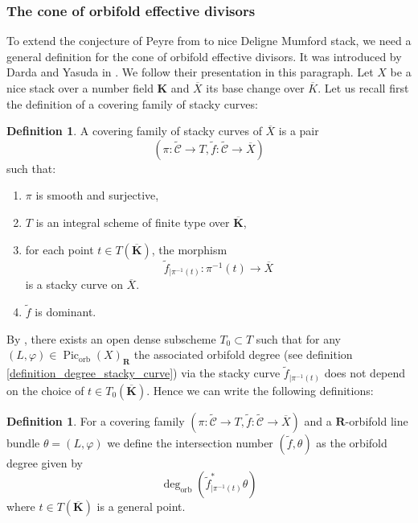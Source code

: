 \documentclass{proc-l}
\newcommand{\R}{\mathbf{R}}
\newcommand{\K}{\mathbf{K}}
\DeclareMathOperator{\Pic}{Pic}
\DeclareMathOperator{\orb}{orb}
\theoremstyle{definition}
\newtheorem{definition}[theorem]{Definition}
\theoremstyle{remark}
\numberwithin{equation}{section}
\begin{document}
\subsubsection{The cone of orbifold effective divisors}

 To extend the conjecture of Peyre from \cite[question 4.8]{Peyre_beyond_height} to nice Deligne Mumford stack, we need a general definition for the cone of orbifold effective divisors. It was introduced by Darda and Yasuda in \cite[section 8]{darda2024batyrevmanin}. We follow their presentation in this paragraph. Let $X$ be a nice stack over a number field $\K$ and $\overline{X}$ its base change over $\overline{K}$. Let us recall first the definition of a covering family of stacky curves:

 \begin{definition}
     A covering family of stacky curves of $\overline{X}$ is a pair $$\left( \pi : \tilde{\mathcal{C}} \rightarrow T,  \tilde{f} : \tilde{\mathcal{C}} \rightarrow \overline{X} \right)$$ such that:
     \begin{enumerate}
         \item $\pi$ is smooth and surjective,
         \item $T$ is an integral scheme of finite type over $\overline{\K}$,
         \item for each point $t \in T(\overline{\K})$, the morphism $$\tilde{f}_{\mid \pi^{-1}(t)} : \pi^{-1}(t) \rightarrow \overline{X} $$is a stacky curve on $\overline{X}$.
         \item $\tilde{f}$ is dominant.
     \end{enumerate}
 \end{definition}

By \cite[lemma 8.6]{darda2024batyrevmanin}, there exists an open dense subscheme $T_0 \subset T$ such that for any $(L,\varphi) \in \Pic_{\orb}(X)_{\R}$ the associated orbifold degree (see definition \ref{definition_degree_stacky_curve}) via the stacky curve $\tilde{f}_{\mid \pi^{-1}(t)}$ does not depend on the choice of $t \in T_0(\overline{\K})$. Hence we can write the following definitions:

\begin{definition}\label{definition_orbifold_intersection_number}
    For a covering family $\left( \pi : \tilde{\mathcal{C}} \rightarrow T,  \tilde{f} : \tilde{\mathcal{C}} \rightarrow \overline{X} \right)$ and a $\R$-orbifold line bundle $\theta = (L,\varphi)$ we define the intersection number $(\tilde{f},\theta)$ as the orbifold degree given by $$\deg_{\orb}( \tilde{f}_{\mid \pi^{-1}(t)}^* \theta )$$where $t \in T(\overline{\K})$ is a general point.
\end{definition}
\end{document}
